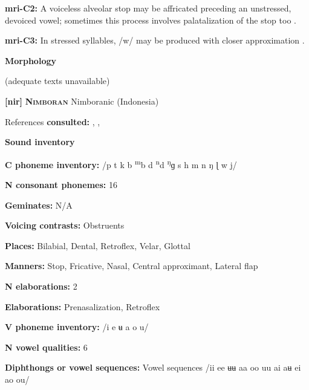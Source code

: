 \textbf{mri-C2:} A voiceless alveolar stop may be affricated preceding an unstressed, devoiced vowel; sometimes this process involves palatalization of the stop too \citep{Bauer1999}.



\textbf{mri-C3:} In stressed syllables, /w/ may be produced with closer approximation \citep[545]{Bauer1999}.



\textbf{Morphology}



(adequate texts unavailable)



\textbf{[nir]}   \textbf{\textsc{Nimboran}}  Nimboranic (Indonesia)



References \textbf{consulted:} \citet{Anceaux1965}, \citet{MayMay1981}, \citet{May1997}



\textbf{Sound inventory}



\textbf{C phoneme inventory:} /p t k b \textsuperscript{m}b d \textsuperscript{n}d \textsuperscript{ŋ}ɡ s h m n ŋ ɭ w j/



\textbf{N consonant phonemes:} 16



\textbf{Geminates:} N/A



\textbf{Voicing contrasts:} Obstruents



\textbf{Places:} Bilabial, Dental, Retroflex, Velar, Glottal



\textbf{Manners:} Stop, Fricative, Nasal, Central approximant, Lateral flap



\textbf{N elaborations:} 2



\textbf{Elaborations:} Prenasalization, Retroflex



\textbf{V phoneme inventory:} /i e ʉ a o u/



\textbf{N vowel qualities:} 6



\textbf{Diphthongs or vowel sequences:} Vowel sequences /ii ee ʉʉ aa oo uu ai aʉ ei ao ou/



